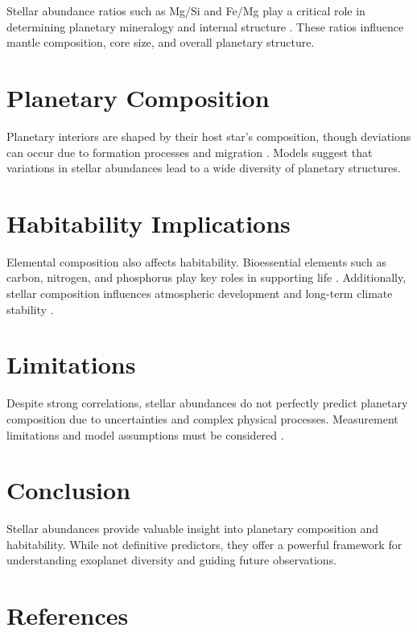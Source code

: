 \documentclass[12pt]{article}
\begin{document}
Stellar abundance ratios such as Mg/Si and Fe/Mg play a critical role in determining planetary mineralogy and internal structure \citep{Hinkel2018}. These ratios influence mantle composition, core size, and overall planetary structure.

\section{Planetary Composition}

Planetary interiors are shaped by their host star's composition, though deviations can occur due to formation processes and migration \citep{Spaargaren2020}. Models suggest that variations in stellar abundances lead to a wide diversity of planetary structures.

\section{Habitability Implications}

Elemental composition also affects habitability. Bioessential elements such as carbon, nitrogen, and phosphorus play key roles in supporting life \citep{Hinkel2020}. Additionally, stellar composition influences atmospheric development and long-term climate stability \citep{Truitt2019}.

\section{Limitations}

Despite strong correlations, stellar abundances do not perfectly predict planetary composition due to uncertainties and complex physical processes. Measurement limitations and model assumptions must be considered \citep{Hinkel2014}.

\section{Conclusion}

Stellar abundances provide valuable insight into planetary composition and habitability. While not definitive predictors, they offer a powerful framework for understanding exoplanet diversity and guiding future observations.

\section*{References}
\end{document}
